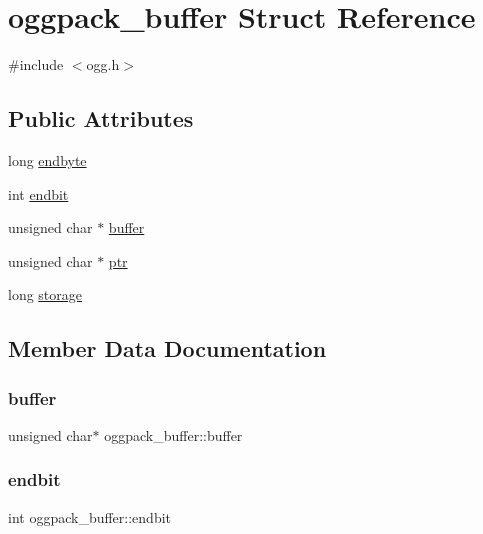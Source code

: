 \hypertarget{structoggpack__buffer}{}\section{oggpack\+\_\+buffer Struct Reference}
\label{structoggpack__buffer}


{\ttfamily \#include $<$ogg.\+h$>$}

\subsection*{Public Attributes}
\begin{DoxyCompactItemize}
\item 
long \mbox{\hyperlink{structoggpack__buffer_a416200dd77da3603dce3913826d74207}{endbyte}}
\item 
int \mbox{\hyperlink{structoggpack__buffer_a5a2ecb260025f73201e58dbd621c9f8b}{endbit}}
\item 
unsigned char $\ast$ \mbox{\hyperlink{structoggpack__buffer_a2d828a6e3d0a57f44debf56665ad402e}{buffer}}
\item 
unsigned char $\ast$ \mbox{\hyperlink{structoggpack__buffer_a479984d9646e0fba6da8aff21e5c3b64}{ptr}}
\item 
long \mbox{\hyperlink{structoggpack__buffer_a1eea2afb662c8080a902d224773fee4e}{storage}}
\end{DoxyCompactItemize}


\subsection{Member Data Documentation}
\mbox{\label{structoggpack__buffer_a2d828a6e3d0a57f44debf56665ad402e}} 
\subsubsection{\texorpdfstring{buffer}{buffer}}
{\footnotesize\ttfamily unsigned char$\ast$ oggpack\+\_\+buffer\+::buffer}

\mbox{\label{structoggpack__buffer_a5a2ecb260025f73201e58dbd621c9f8b}} 
\subsubsection{\texorpdfstring{endbit}{endbit}}
{\footnotesize\ttfamily int oggpack\+\_\+buffer\+::endbit}

